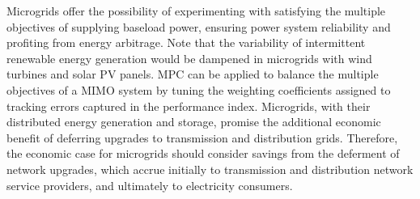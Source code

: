 Microgrids offer the possibility of experimenting with satisfying the multiple objectives of supplying baseload power, ensuring power system reliability and profiting from energy arbitrage.  Note that the variability of intermittent renewable energy generation would be dampened in microgrids with wind turbines and solar PV panels.  MPC can be applied to balance the multiple objectives of a MIMO system by tuning the weighting coefficients assigned to tracking errors captured in the performance index.  Microgrids, with their distributed energy generation and storage, promise the additional economic benefit of deferring upgrades to transmission and distribution grids.  Therefore, the economic case for microgrids should consider savings from the deferment of network upgrades, which accrue initially to transmission and distribution network service providers, and ultimately to electricity consumers.





